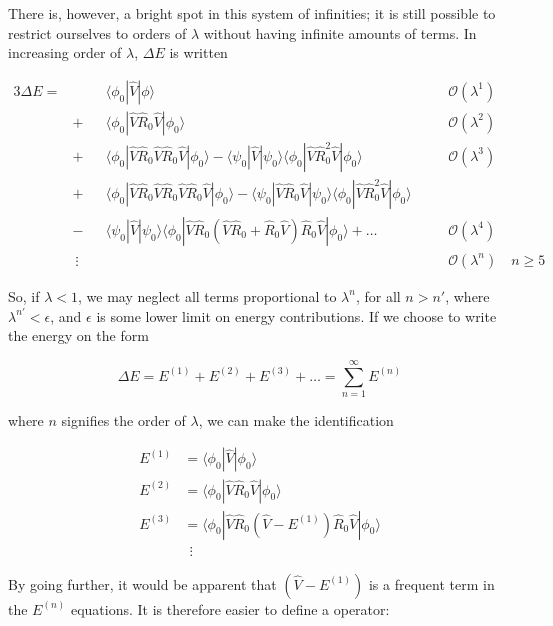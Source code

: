 \documentclass[10pt]{report}
\begin{document}
	There is, however, a bright spot in this system of infinities; it is still possible to restrict ourselves to orders of $\lambda$ without having infinite amounts of terms. In increasing order of $\lambda$, $\Delta E$ is written
	
	\begin{alignat*}{3}
			\Delta E = &\:&&\langle\phi_0|\hat{V}|\phi\rangle \quad&&\mathcal{O}(\lambda^1)\\
			&+&& \langle\phi_0|\hat{V}\hat{R}_0\hat{V}|\phi_0\rangle	\quad&&\mathcal{O}(\lambda^2)\\
			&+&& \langle\phi_0|\hat{V}\hat{R}_0\hat{V}\hat{R}_0\hat{V}|\phi_0\rangle - \langle\psi_0|\hat{V}|\psi_0\rangle\langle\phi_0|\hat{V}\hat{R}_0^2\hat{V}|\phi_0\rangle \quad&&\mathcal{O}(\lambda^3)\\
			&+&& \langle\phi_0|\hat{V}\hat{R}_0\hat{V}\hat{R}_0\hat{V}\hat{R}_0\hat{V}|\phi_0\rangle - \langle\psi_0|\hat{V}\hat{R}_0\hat{V}|\psi_0\rangle\langle\phi_0|\hat{V}\hat{R}_0^2\hat{V}|\phi_0\rangle \quad&&\\
			&-&& \langle\psi_0|\hat{V}|\psi_0\rangle\langle\phi_0|\hat{V}\hat{R}_0\left( \hat{V}\hat{R}_0 + \hat{R}_0\hat{V} \right)\hat{R}_0\hat{V}|\phi_0\rangle + \ldots\quad&&\mathcal{O}(\lambda^4)\\
			&\:\vdots&& \quad&&\mathcal{O}(\lambda^n)\quad n\geq 5
	\end{alignat*}
	
	So, if $\lambda < 1$, we may neglect all terms proportional to $\lambda^n$, for all $n>n'$, where $\lambda^{n'} < \epsilon$, and $\epsilon$ is some lower limit on energy contributions. If we choose to write the energy on the form
	
	\begin{equation}
		\Delta E = E^{(1)} + E^{(2)} + E^{(3)} + \ldots = \sum_{n=1}^\infty E^{(n)}
	\end{equation}
	
	where $n$ signifies the order of $\lambda$, we can make the identification
	
	\begin{align}
		E^{(1)} &= \langle\phi_0|\hat{V}|\phi_0\rangle\\
		E^{(2)} &= \langle\phi_0|\hat{V}\hat{R}_0\hat{V}|\phi_0\rangle\\
		E^{(3)} &= \langle\phi_0|\hat{V}\hat{R}_0(\hat{V}-E^{(1)})\hat{R}_0\hat{V}|\phi_0\rangle\\
		&\:\:\vdots
	\end{align}
	
	By going further, it would be apparent that $(\hat{V}-E^{(1)})$ is a frequent term in the $E^{(n)}$ equations. It is therefore easier to define a operator:
	
\end{document}
